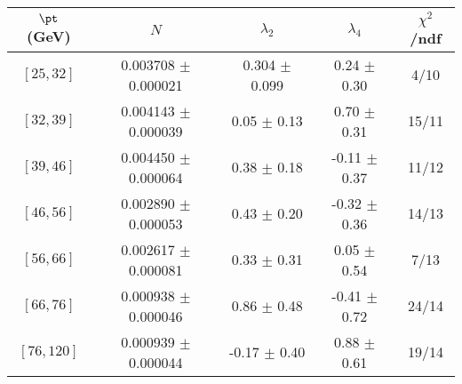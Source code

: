\begin{tabular}{c||c|c|c|c}
$\pt$ (GeV) & $N$ & $\lambda_{2}$ & $\lambda_4$  & $\chi^2$/ndf  \\
\hline
$[25, 32]$ & 0.003708 $\pm$ 0.000021 & 0.304 $\pm$ 0.099 & 0.24 $\pm$ 0.30 & 4/10\\
$[32, 39]$ & 0.004143 $\pm$ 0.000039 & 0.05 $\pm$ 0.13 & 0.70 $\pm$ 0.31 & 15/11\\
$[39, 46]$ & 0.004450 $\pm$ 0.000064 & 0.38 $\pm$ 0.18 & -0.11 $\pm$ 0.37 & 11/12\\
$[46, 56]$ & 0.002890 $\pm$ 0.000053 & 0.43 $\pm$ 0.20 & -0.32 $\pm$ 0.36 & 14/13\\
$[56, 66]$ & 0.002617 $\pm$ 0.000081 & 0.33 $\pm$ 0.31 & 0.05 $\pm$ 0.54 & 7/13\\
$[66, 76]$ & 0.000938 $\pm$ 0.000046 & 0.86 $\pm$ 0.48 & -0.41 $\pm$ 0.72 & 24/14\\
$[76, 120]$ & 0.000939 $\pm$ 0.000044 & -0.17 $\pm$ 0.40 & 0.88 $\pm$ 0.61 & 19/14\\
\end{tabular}
